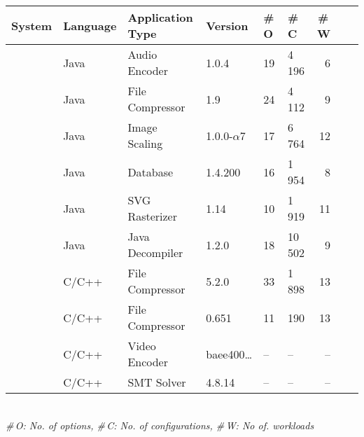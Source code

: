 \begin{tabular}{p{1.1cm}p{0.9cm}p{1.9cm}p{1.0cm}p{0.2cm}p{0.2cm}rrr}
		\toprule
		\textbf{System} & \textbf{Language} & \textbf{Application Type} & \textbf{Version} & \textbf{\#\,O} & \textbf{\#\,C} & \textbf{\#\,W}  \\
		\midrule
		\jumper & Java & Audio Encoder & 1.0.4 & 19 & 4\,196 & 6   \\
		
		\kanzi &Java  & File Compressor & 1.9 & 24 & 4\,112 & 9 \\
			
		\dconvert & Java & Image Scaling & 1.0.0-$\alpha$7 & 17 & 6\,764 & 12  \\
				
		\htwo & Java & Database & 1.4.200 & 16 & 1\,954  & 8  \\
		
		\batik & Java & SVG Rasterizer & 1.14 & 10 & 1\,919 &  11  \\
		
		\jadx & Java & Java Decompiler & 1.2.0 & 18 & 10\,502 & 9  \\
		
		\midrule
		
		 \xz & C/C++ & File Compressor & 5.2.0 & 33 & 1\,898 & 13  \\
		\lrzip & C/C++ & File Compressor & 0.651 & 11 & 190 & 13  \\
		\midrule
		\rowcolor{green!70!black}\xzwo & C/C++ & Video Encoder & baee400\ldots & -- & -- & --  \\
		\rowcolor{green!70!black}\zdrei & C/C++ & SMT Solver & 4.8.14 & -- & -- & --  \\
\bottomrule

\end{tabular}\\
{\centering\vspace{1mm}\textit{\#\,O: No. of options, \#\,C: No. of configurations, \#\,W: No of. workloads}}
